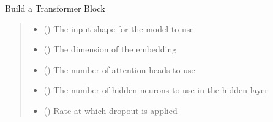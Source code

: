\documentclass[letterpaper,10pt,english]{sphinxmanual}
\begin{document}

\begin{fulllineitems}
\label{\detokenize{beyondml.tflow.utils:beyondml.tflow.utils.transformer.build_transformer_block}}
\pysigstartsignatures
{}
\pysigstopsignatures
\sphinxAtStartPar
Build a Transformer Block
\begin{quote}\begin{description}
\begin{itemize}
\item {} 
\sphinxAtStartPar
{} () \textendash{} The input shape for the model to use

\item {} 
\sphinxAtStartPar
{} () \textendash{} The dimension of the embedding

\item {} 
\sphinxAtStartPar
{} () \textendash{} The number of attention heads to use

\item {} 
\sphinxAtStartPar
{} () \textendash{} The number of hidden neurons to use in the hidden layer

\item {} 
\sphinxAtStartPar
{} (\sphinxstyleliteralemphasis{\sphinxupquote{ (}}\sphinxstyleliteralemphasis{\sphinxupquote{)}}) \textendash{} Rate at which dropout is applied


\end{itemize}
\end{description}
\end{quote}
\end{fulllineitems}
\end{document}
